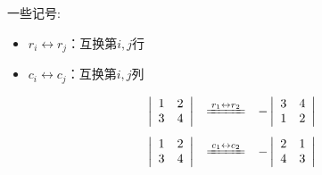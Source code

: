 \begin{zhu}一些记号:
  \begin{itemize}
  \item $r_i \leftrightarrow r_j $：互换第$i,j$行 \\[0.1in]
  \item $c_i \leftrightarrow c_j $：互换第$i,j$列
  \end{itemize}
\end{zhu}


\begin{li}
  $$
  \begin{array}{rcl}
    \left|
    \begin{array}{ccc}
      1 & 2  \\
      3 & 4  \\
    \end{array}
    \right|        &\xlongequal[]{r_1\leftrightarrow r_2}&
                                                           -\left|
                                                           \begin{array}{ccc}
                                                             3 & 4 \\
                                                             1 & 2  
                                                           \end{array}
                                                                 \right|    \\[0.2in]
    \left|
    \begin{array}{ccc}
      1 & 2  \\
      3 & 4  
    \end{array}
          \right|
        &\xlongequal[]{c_1\leftrightarrow c_2}&
                                                -\left|
                                                \begin{array}{ccc}
                                                  2 & 1  \\
                                                  4 & 3  
                                                \end{array}
                                                      \right|    
  \end{array}
  $$    
\end{li}


